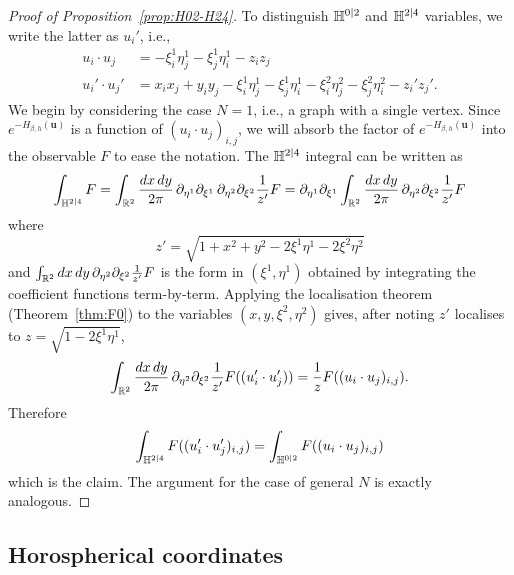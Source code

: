 \documentclass[11pt]{amsart}
\numberwithin{equation}{section}
\numberwithin{theorem}{section}
\newcommand{\V}[1]{\boldsymbol{#1}}
\begin{document}
\begin{proof}[Proof of Proposition~\ref{prop:H02-H24}]
  To distinguish $\mathbb{H}^{0|2}$ and $\mathbb{H}^{2|4}$ variables, we write the latter as $u_i'$, i.e., 
  \begin{align}
    u_i \cdot u_j &= -\xi_i^1\eta_j^1-\xi_j^1\eta_i^1 - z_i z_j
                    \\
    u_i' \cdot u_j' &= x_ix_j + y_iy_j  -\xi_i^1\eta_j^1-\xi_j^1\eta_i^1 -\xi_i^2\eta_j^2-\xi_j^2\eta_i^2 - z_i' z_j'.
  \end{align}
  We begin by considering the case $N=1$, i.e., a graph with a single
  vertex.   Since $e^{-H_{\beta,h}(\V{u})}$ is a function of $(u_i\cdot
  u_j)_{i,j}$, we will absorb the factor of  $e^{-H_{\beta,h}(\V{u})}$ into the observable $F$ to ease the
    notation. 
  The $\mathbb{H}^{2|4}$ integral can be written as
  \begin{equation}
    \int_{\mathbb{H}^{2|4}}F
    = \int_{\mathbb{R}^{2}} \frac{dx \, dy}{2\pi}
      \, \partial_{\eta^1}\partial_{\xi^1}
      \, \partial_{\eta^{2}}\partial_{\xi^{2}}     \frac{1}{z'} F
    = 
      \partial_{\eta^1}\partial_{\xi^1} 
\int_{\mathbb{R}^2} \frac{dx \, dy}{2\pi}
      \, \partial_{\eta^{2}}\partial_{\xi^{2}} \frac{1}{z'} F
  \end{equation}
  where
  \begin{equation}
    z' = \sqrt{1+x^2 +y^2 - 2\xi^1\eta^1-
        2\xi^{2}\eta^{2}}
  \end{equation}
  and $\int_{\mathbb{R}^{2}}dx \, dy
  \, \partial_{\eta^{2}}\partial_{\xi^{2}} \frac{1}{z'} F$ is the
  form in $(\xi^{1},\eta^{1})$ obtained by integrating the coefficient functions
  term-by-term.
  Applying the localisation theorem (Theorem~\ref{thm:F0}) to the variables 
  $(x,y,\xi^{2},\eta^{2})$  gives, after noting $z'$ localises to
  $z = \sqrt{1-2 \xi^{1}\eta^{1}}$, 
  \begin{align}
    \int_{\mathbb{R}^2} \frac{dx \, dy}{2\pi}
    \, \partial_{\eta^{2}}\partial_{\xi^{2}}
    \frac{1}{z'} F((u_i'\cdot
    u_j')) = \frac{1}{z}F((u_i\cdot u_j)_{i,j}). 
  \end{align}
  Therefore
  \begin{equation}
    \int_{\mathbb{H}^{2|4}} F((u'_i\cdot u_j')_{i,j})
    = \int_{\mathbb{H}^{0|2}} F((u_i\cdot u_j)_{i,j})
  \end{equation}
  which is the claim.
  The argument for the case of general $N$ is exactly analogous.
\end{proof}



\subsection{Horospherical coordinates}
\end{document}
